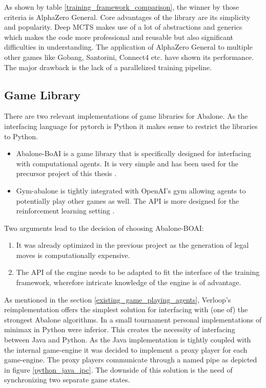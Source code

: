 As shown by table \ref{training_framework_comparison}, the winner by those criteria is AlphaZero General. Core advantages of the library are its simplicity and popularity. Deep MCTS makes use of a lot of abstractions and generics which makes the code more professional and reusable but also significant difficulties in understanding. The application of AlphaZero General to multiple other games like Gobang, Santorini, Connect4 etc. have shown its performance. The major drawback is the lack of a parallelized training pipeline.

\subsection{Game Library}
There are two relevant implementations of game libraries for Abalone. As the interfacing language for pytorch is Python it makes sense to restrict the libraries to Python.

\begin{itemize}
    \item Abalone-BoAI is a game library that is specifically designed for interfacing with computational agents. It is very simple and has been used for the precursor project of this thesis \cite{scriptim_scriptimabalone-boai_2021}.
    \item Gym-abalone is tightly integrated with OpenAI's gym allowing agents to potentially play other games as well. The API is more designed for the reinforcement learning setting \cite{towzeur_towzeurgym-abalone_2021}.
\end{itemize}

Two arguments lead to the decision of choosing Abalone-BOAI:
\begin{enumerate}
    \item It was already optimized in the previous project as the generation of legal moves is computationally expensive.
    \item The API of the engine needs to be adapted to fit the interface of the training framework, wherefore intricate knowledge of the engine is of advantage.
\end{enumerate}

As mentioned in the section \ref{existing_game_playing_agents}, Verloop's reimplementation \cite{verloop_abaloneai_nodate} offers the simplest solution for interfacing with (one of) the strongest Abalone algorithms. In a small tournament personal implementations of minimax in Python \cite{claussen_abalone_2021} were inferior. This creates the necessity of interfacing between Java and Python. As the Java implementation is tightly coupled with the internal game-engine it was decided to implement a proxy player for each game-engine. The proxy players communicate through a named pipe as depicted in figure \ref{python_java_ipc}. The downside of this solution is the need of synchronizing two separate game states.

